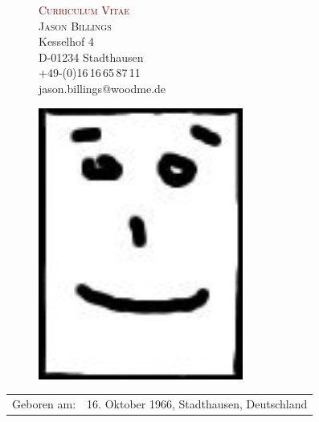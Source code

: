 \documentclass[a4paper,11pt]{scrartcl}
\begin{document}
\onehalfspace

\parindent0mm
\renewcommand{\arraystretch}{1.2}

\begin{figure}
\begin{minipage}{0.6\linewidth}
{\Huge \textsc{\textcolor{Maroon}{Curriculum Vitae}}}\\[0.7cm]
{\Large \textsc{Jason Billings}}\\[0.2cm]
Kesselhof 4\\
D-01234 Stadthausen\\
+49-(0)16\,16\,65\,87\,11\\
jason.billings@woodme.de\\[-1.5cm]
\end{minipage}
\begin{minipage}{0.4\linewidth}
\hspace*{2.4cm} \includegraphics[width=0.6\textwidth]{PortraitLebenslauf.jpg}
\end{minipage}
\end{figure}

\vspace*{0.3cm}

\begin{tabularx}{\textwidth}{p{2.8cm}X}
Geboren am: & 16. Oktober 1966, Stadthausen, Deutschland\\
\end{tabularx}

\vspace*{0.9cm}
\end{document}
